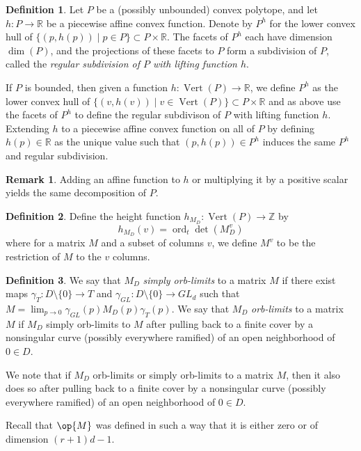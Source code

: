 \documentclass[12pt]{amsart}
\newcommand{\mb}{\mathbb}
\newcommand{\Vt}{{\operatorname{Vert}}}
\theoremstyle{plain}
\theoremstyle{definition}
\newtheorem{Def}{Definition}[section]
\newtheorem{Rem}[Thm]{Remark}
\theoremstyle{remark}
\begin{document}
\begin{Def}
\label{regularsubdef}
Let $P$ be a (possibly unbounded) convex polytope, and let $h:P \to \mb{R}$ be a piecewise affine convex function. Denote by $P^h$ for the lower convex hull of $\{(p,h(p))\mid p \in P\}\subset P \times \mb{R}$. The facets of $P^h$ each have dimension $\dim(P)$, and the projections of these facets to $P$ form a subdivision of $P$, called the \emph{regular subdivision of $P$ with lifting function $h$}.

If $P$ is bounded, then given a function $h:\Vt(P)\to \mb{R}$, we define $P^h$ as the lower convex hull of $\{(v,h(v)) \mid v \in \Vt(P)\} \subset P \times \mb{R}$ and as above use the facets of $P^h$ to define the regular subdivison of $P$ with lifting function $h$. Extending $h$ to a piecewise affine convex function on all of $P$ by defining $h(p) \in \mb{R}$ as the unique value such that $(p,h(p)) \in P^h$ induces the same $P^h$ and regular subdivision.




\end{Def}
\begin{Rem}
Adding an affine function to $h$ or multiplying it by a positive scalar yields the same decomposition of $P$.
\end{Rem}
\begin{Def}
Define the height function $h_{M_D} : \Vt(P) \to \mb{Z}$ by \[h_{M_D}(v) = \operatorname{ord}_t \det(M_D^v)\] where for a matrix $M$ and a subset of columns $v$, we define $M^v$ to be the restriction of $M$ to the $v$ columns.
\end{Def}
\begin{Def}
\label{orblimitdef}
We say that $M_D$ \emph{simply orb-limits} to a matrix $M$ if there exist maps $\gamma_T: D\setminus\{0\}\to T$ and $\gamma_{GL}: D\setminus\{0\}\to GL_{d}$ such that $M=\lim_{p \to 0}\gamma_{GL}(p) M_D(p) \gamma_T(p) $. We say that $M_D$ \emph{orb-limits} to a matrix $M$ if $M_D$ simply orb-limits to $M$ after pulling back to a finite cover by a nonsingular curve (possibly everywhere ramified) of an open neighborhood of $0\in D$. 
\end{Def}

We note that if $M_D$ orb-limits or simply orb-limits to a matrix $M$, then it also does so after pulling back to a finite cover by a nonsingular curve (possibly everywhere ramified) of an open neighborhood of $0\in D$.

Recall that $\op{M}$ was defined in such a way that it is either zero or of dimension $(r+1)d-1$.
\end{document}
